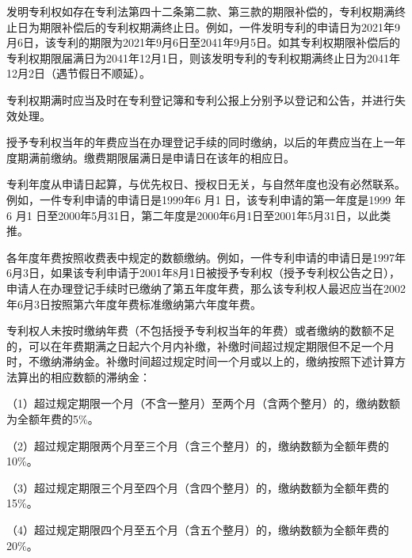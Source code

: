 发明专利权如存在专利法第四十二条第二款、第三款的期限补偿的，专利权期满终止日为期限补偿后的专利权期满终止日。例如，一件发明专利的申请日为2021年9月6日，该专利的期限为2021年9月6日至2041年9月5日。如其专利权期限补偿后的专利权期限届满日为2041年12月1日，则该发明专利的专利权期满终止日为2041年12月2日（遇节假日不顺延）。

专利权期满时应当及时在专利登记簿和专利公报上分别予以登记和公告，并进行失效处理。

授予专利权当年的年费应当在办理登记手续的同时缴纳，以后的年费应当在上一年度期满前缴纳。缴费期限届满日是申请日在该年的相应日。

专利年度从申请日起算，与优先权日、授权日无关，与自然年度也没有必然联系。例如，一件专利申请的申请日是1999年6 月1 日，该专利申请的第一年度是1999 年6 月1 日至2000年5月31日，第二年度是2000年6月1日至2001年5月31日，以此类推。

各年度年费按照收费表中规定的数额缴纳。例如，一件专利申请的申请日是1997年6月3日，如果该专利申请于2001年8月1日被授予专利权（授予专利权公告之日），申请人在办理登记手续时已缴纳了第五年度年费，那么该专利权人最迟应当在2002年6月3日按照第六年度年费标准缴纳第六年度年费。

专利权人未按时缴纳年费（不包括授予专利权当年的年费）或者缴纳的数额不足的，可以在年费期满之日起六个月内补缴，补缴时间超过规定期限但不足一个月时，不缴纳滞纳金。补缴时间超过规定时间一个月或以上的，缴纳按照下述计算方法算出的相应数额的滞纳金：

{\setlength{\parindent}{17.1bp}（1）超过规定期限一个月（不含一整月）至两个月（含两个整月）的，缴纳数额为全额年费的5\%。\par}

{\setlength{\parindent}{17.1bp}（2）超过规定期限两个月至三个月（含三个整月）的，缴纳数额为全额年费的10\%。\par}

{\setlength{\parindent}{17.1bp}（3）超过规定期限三个月至四个月（含四个整月）的，缴纳数额为全额年费的15\%。\par}

{\setlength{\parindent}{17.1bp}（4）超过规定期限四个月至五个月（含五个整月）的，缴纳数额为全额年费的20\%。\par}

